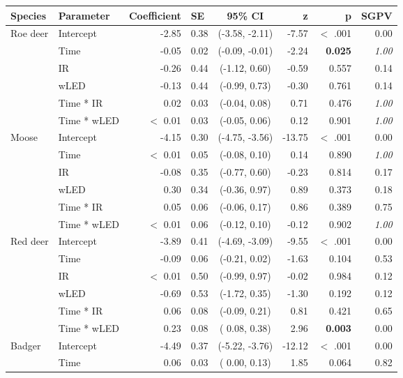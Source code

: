 \centering
\begin{tabular}[c]{llrlcrrr}
  \toprule
Species & Parameter & Coefficient & SE & 95\% CI & z & p & SGPV \\ 
\midrule
Roe deer & Intercept & -2.85 & 0.38 & (-3.58, -2.11) & -7.57 & $<$ .001 & 0.00 \\ 
& Time & -0.05 & 0.02 & (-0.09, -0.01) & -2.24 & \textbf{0.025}  & \textit{1.00} \\ 
& IR & -0.26 & 0.44 & (-1.12,  0.60) & -0.59 & 0.557  & 0.14 \\ 
& wLED & -0.13 & 0.44 & (-0.99,  0.73) & -0.30 & 0.761  & 0.14 \\ 
& Time * IR & 0.02 & 0.03 & (-0.04,  0.08) & 0.71 & 0.476  & \textit{1.00} \\ 
& Time * wLED & $<$ 0.01 & 0.03 & (-0.05,  0.06) & 0.12 & 0.901  & \textit{1.00} \\ 
\midrule
Moose & Intercept & -4.15 & 0.30 & (-4.75, -3.56) & -13.75 & $<$ .001 & 0.00 \\ 
& Time & $<$ 0.01 & 0.05 & (-0.08,  0.10) & 0.14 & 0.890  & \textit{1.00} \\ 
& IR & 		-0.08 & 0.35 & (-0.77,  0.60) & -0.23 & 0.814  & 0.17 \\ 
& wLED & 	 0.30 & 0.34 & (-0.36,  0.97) & 0.89 & 0.373  & 0.18 \\ 
& Time * IR & 0.05 & 0.06 & (-0.06,  0.17) & 0.86 & 0.389  & 0.75 \\ 
& Time * wLED & $<$ 0.01 & 0.06 & (-0.12,  0.10) & -0.12 & 0.902  & \textit{1.00} \\ 
\midrule
Red deer & Intercept & -3.89 & 0.41 & (-4.69, -3.09) & -9.55 & $<$ .001 & 0.00 \\ 
& Time & -0.09 & 0.06 & (-0.21,  0.02) & -1.63 & 0.104  & 0.53 \\ 
& IR & $<$ 0.01 & 0.50 & (-0.99,  0.97) & -0.02 & 0.984  & 0.12 \\ 
& wLED & -0.69 & 0.53 & (-1.72,  0.35) & -1.30 & 0.192  & 0.12 \\ 
& Time * IR & 0.06 & 0.08 & (-0.09,  0.21) & 0.81 & 0.421  & 0.65 \\ 
& Time * wLED & 0.23 & 0.08 & ( 0.08,  0.38) & 2.96 & \textbf{0.003}  & 0.00 \\ 
\midrule
Badger & Intercept & -4.49 & 0.37 & (-5.22, -3.76) & -12.12 & $<$ .001 & 0.00 \\ 
& Time & 0.06 & 0.03 & ( 0.00,  0.13) & 1.85 & 0.064  & 0.82 \\ 

\end{tabular}
